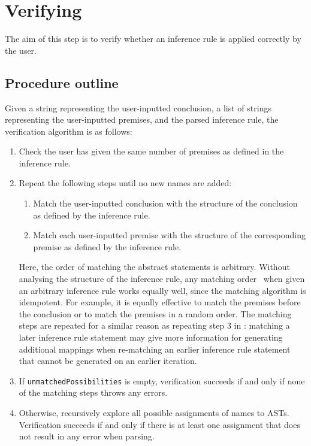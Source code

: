 \section{Verifying}
\label{checking:verifying}
The aim of this step is to verify whether an inference rule is applied correctly by the user.

\subsection{Procedure outline}
Given a string representing the user-inputted conclusion, a list of strings representing the user-inputted premises, and the parsed inference rule, the verification algorithm is as follows:
\begin{enumerate}
    \item Check the user has given the same number of premises as defined in the inference rule.
    \item Repeat the following steps until no new names are added:
    \begin{enumerate}
        \item Match the user-inputted conclusion with the structure of the conclusion as defined by the inference rule.
        \item Match each user-inputted premise with the structure of the corresponding premise as defined by the inference rule.
    \end{enumerate}
    Here, the order of matching the abstract statements is arbitrary. Without analysing the structure of the inference rule, any matching order~ when given an arbitrary inference rule works equally well, since the matching algorithm is idempotent. For example, it is equally effective to match the premises before the conclusion or to match the premises in a random order. The matching steps are repeated for a similar reason as repeating step 3 in : matching a later inference rule statement may give more information for generating additional mappings when re-matching an earlier inference rule statement that cannot be generated on an earlier iteration.
    \item If \lstinline{unmatchedPossibilities} is empty, verification succeeds if and only if none of the matching steps throws any errors.
    \item Otherwise, recursively explore all possible assignments of names to ASTs. Verification succeeds if and only if there is at least one assignment that does not result in any error when parsing.
\end{enumerate}